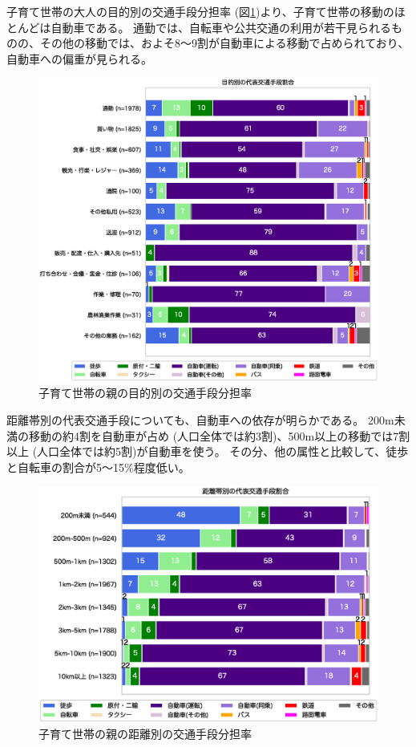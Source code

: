 \documentclass[a4paper,12pt, uplatex]{jsbook}
\begin{document}
\clearpage
子育て世帯の大人の目的別の交通手段分担率 (図\ref{fig:mode_share_purpose_parent})より、子育て世帯の移動のほとんどは自動車である。
通勤では、自転車や公共交通の利用が若干見られるものの、その他の移動では、およそ8〜9割が自動車による移動で占められており、自動車への偏重が見られる。
%
\begin{figure}[H]
    \centering
    \includegraphics[width=1.0\textwidth]{picture/mode_share_purpose_子育て.eps}
    \caption{子育て世帯の親の目的別の交通手段分担率}
    \label{fig:mode_share_purpose_parent}
\end{figure}

\clearpage
距離帯別の代表交通手段についても、自動車への依存が明らかである。
200m未満の移動の約4割を自動車が占め (人口全体では約3割)、500m以上の移動では7割以上 (人口全体では約5割)が自動車を使う。
その分、他の属性と比較して、徒歩と自転車の割合が5〜15\%程度低い。
%
\begin{figure}[H]
    \centering
    \includegraphics[width=1.0\textwidth]{picture/mode_share_distance_子育て.eps}
    \caption{子育て世帯の親の距離別の交通手段分担率}
    \label{fig:mode_share_dist_parent}
\end{figure}
\end{document}
